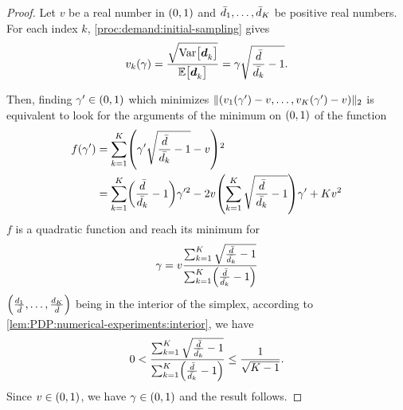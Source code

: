 \begin{proof}
Let $v$ be a real number in $\bracket{0,1}$ and $\bar{d}_1,\ldots,\bar{d}_K$ be positive real numbers.
For each index $k$, \cref{proc:demand:initial-sampling} gives
\begin{equation}
  v_k\bracket{\gamma}
  = \frac{\sqrt{\vari\sqbracket{\va\demand_k}}}{\espe\sqbracket{\va\demand_k}}
  = \gamma\sqrt{\frac{\bar{\demand}}{\bar{\demand_k}}-1}.
\end{equation}

Then, finding $\gamma'\in\bracket{0,1}$ which minimizes $\norm{\bracket{v_1(\gamma')-v,\ldots,v_K(\gamma')-v}}_2$ is equivalent to look for the arguments of the minimum on $\bracket{0,1}$ of the function
\begin{subequations}
\begin{align}
  f\bracket{\gamma'}
  &= \sum_{k=1}^K \bracket{\gamma'\sqrt{\frac{\bar{\demand}}{\bar{\demand_k}}-1}-v}^2
  \\
  &= \sum_{k=1}^K\bracket{\frac{\bar{\demand}}{\bar{\demand_k}}-1}\gamma'^2
  - 2v\bracket{\sum_{k=1}^K\sqrt{\frac{\bar{\demand}}{\bar{\demand_k}}-1}}\gamma'
  + K v^2
\end{align}
\end{subequations}
$f$ is a quadratic function and reach its minimum for
\begin{equation}
  \gamma
  =
  v\frac
  {\sum_{k=1}^K\sqrt{\frac{\bar{\demand}}{\bar{\demand_k}}-1}}
  {\sum_{k=1}^K\bracket{\frac{\bar{\demand}}{\bar{\demand_k}}-1}}
\end{equation}
$\bracket{\frac{\demand_1}{\bar{\demand}},\ldots,\frac{\demand_K}{\bar{\demand}}}$ being in the interior of the simplex, according to \cref{lem:PDP:numerical-experiments:interior}, we have
\begin{equation}
  0 <
  \frac
  {\sum_{k=1}^K\sqrt{\frac{\bar{\demand}}{\bar{\demand_k}}-1}}
  {\sum_{k=1}^K\bracket{\frac{\bar{\demand}}{\bar{\demand_k}}-1}}
  \le
  \frac{1}{\sqrt{K-1}}.
\end{equation}
Since $v\in\bracket{0,1}$, we have $\gamma\in\bracket{0,1}$ and the result follows.
\end{proof}



